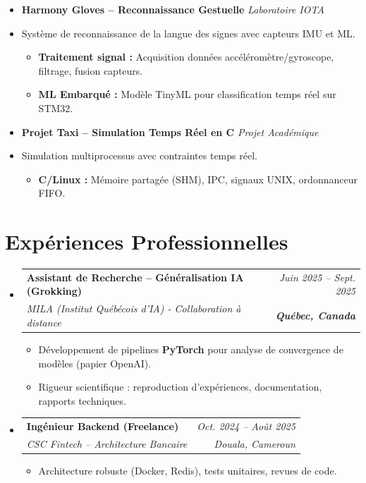 \documentclass[a4paper,11pt]{article}
\makeatletter
\newcommand{\resumeSubheading}[4]{
  \vspace{-1pt}\item
    \begin{tabular*}{0.97\textwidth}[t]{l@{\extracolsep{\fill}}r}
      \textbf{#1} & \textit{\small #2} \\
      \textit{\small #3} & \textit{\small #4} \\
    \end{tabular*}\vspace{-5pt}
}
\makeatother
\begin{document}
\begin{itemize}[leftmargin=*, label={}]
\item \textbf{Harmony Gloves -- Reconnaissance Gestuelle} \hfill \textit{Laboratoire IOTA}
\vspace{-2pt}
\item \small{Système de reconnaissance de la langue des signes avec capteurs IMU et ML.}
    \begin{itemize}[leftmargin=0.4cm, nosep, label=\tiny$\bullet$]
        \item \small{\textbf{Traitement signal :} Acquisition données accéléromètre/gyroscope, filtrage, fusion capteurs.}
        \item \small{\textbf{ML Embarqué :} Modèle TinyML pour classification temps réel sur STM32.}
    \end{itemize}
    \vspace{3pt}

\item \textbf{Projet Taxi -- Simulation Temps Réel en C} \hfill \textit{Projet Académique}
\vspace{-2pt}
\item \small{Simulation multiprocessus avec contraintes temps réel.}
    \begin{itemize}[leftmargin=0.4cm, nosep, label=\tiny$\bullet$]
        \item \small{\textbf{C/Linux :} Mémoire partagée (SHM), IPC, signaux UNIX, ordonnanceur FIFO.}
    \end{itemize}

\end{itemize}

\section{Expériences Professionnelles}
\begin{itemize}[leftmargin=*, label={}]

    \resumeSubheading
      {Assistant de Recherche -- Généralisation IA (Grokking)}{Juin 2025 -- Sept. 2025}
      {MILA (Institut Québécois d'IA) - Collaboration à distance}{\textbf{Québec, Canada}}
      \begin{itemize}[leftmargin=0.4cm, nosep, label=\tiny$\bullet$]
        \item \small{Développement de pipelines \textbf{PyTorch} pour analyse de convergence de modèles (papier OpenAI).}
        \item \small{Rigueur scientifique : reproduction d'expériences, documentation, rapports techniques.}
      \end{itemize}
    \vspace{2pt}

    \resumeSubheading
      {Ingénieur Backend (Freelance)}{Oct. 2024 -- Août 2025}
      {CSC Fintech -- Architecture Bancaire}{Douala, Cameroun}
      \begin{itemize}[leftmargin=0.4cm, nosep, label=\tiny$\bullet$]
        \item \small{Architecture robuste (Docker, Redis), tests unitaires, revues de code.}
      \end{itemize}
\end{itemize}
\end{document}
